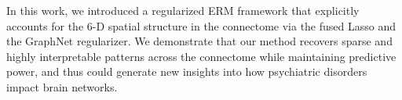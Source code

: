 In this work, we introduced a regularized ERM framework that explicitly accounts for the $6$-D spatial structure in the connectome via the fused Lasso and the GraphNet regularizer. 
We demonstrate that our method recovers sparse and highly interpretable patterns across the connectome while maintaining predictive power, and thus could generate new insights into how psychiatric disorders impact brain networks.
